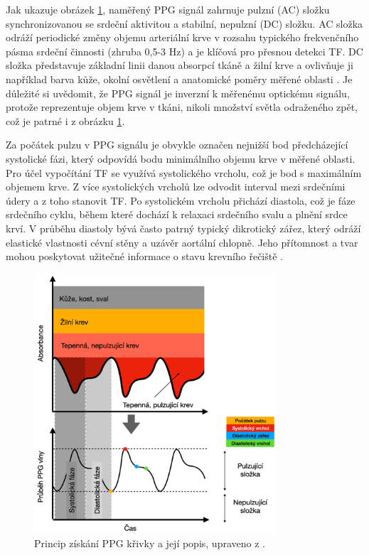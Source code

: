 Jak ukazuje obrázek \ref{fig:signalPPG}, naměřený \acs{PPG} signál zahrnuje pulzní (AC) složku synchronizovanou se srdeční aktivitou a stabilní, nepulzní (DC) složku.
AC složka odráží periodické změny objemu arteriální krve v rozsahu typického frekvenčního pásma srdeční činnosti (zhruba 0,5-3 Hz) a je klíčová pro přesnou detekci \acs{TF}.
DC složka představuje základní linii danou absorpcí tkáně a žilní krve a ovlivňuje ji například barva kůže, okolní osvětlení a anatomické poměry měřené oblasti \cite{ENIKÖ, Park2022}.
Je důležité si uvědomit, že \acs{PPG} signál je inverzní k měřenému optickému signálu, protože reprezentuje objem krve v tkáni, nikoli množství světla odraženého zpět, což je patrné i z obrázku \ref{fig:signalPPG}.

Za počátek pulzu v \acs{PPG} signálu je obvykle označen nejnižší bod předcházející systolické fázi, který odpovídá bodu minimálního objemu krve v měřené oblasti.
Pro účel vypočítání \acs{TF} se využívá systolického vrcholu, což je bod s maximálním objemem krve.
Z více systolických vrcholů lze odvodit interval mezi srdečními údery a z toho stanovit \acs{TF}.
Po systolickém vrcholu přichází diastola, což je fáze srdečního cyklu, během které dochází k relaxaci srdečního svalu a plnění srdce krví.
V průběhu diastoly bývá často patrný typický dikrotický zářez, který odráží elastické vlastnosti cévní stěny a uzávěr aortální chlopně.
Jeho přítomnost a tvar mohou poskytovat užitečné informace o stavu krevního řečiště \cite{Orphanidou2018, Park2022}.

\begin{figure}[ht]
	\centering
	\includegraphics[width=0.8\textwidth]{./obrazky/signalPPG.png}
	\caption[Fiziologický popis PPG signálu]{Princip získání \acs{PPG} křivky a její popis, upraveno z \cite{Park2022}.}
	\label{fig:signalPPG}
\end{figure}